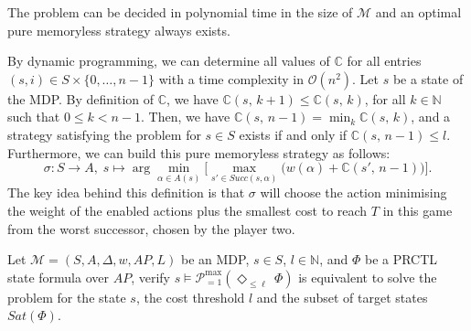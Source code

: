 \begin{theorem} The \SPG{} problem can be decided in polynomial time in the size of $\mathcal{M}$ and %
an optimal pure memoryless strategy always exists.%
\end{theorem}

By dynamic programming, we can determine all values of $\mathbb{C}$ for all entries $(s, i) \in S \times \{0, \dots, n-1\}$ with a time complexity in $\mathcal{O}(n^2)$.
Let $s$ be a state of the MDP. By definition of $\mathbb{C}$, we have $\mathbb{C}(s,\, k + 1) \leq \mathbb{C}(s,\, k)$, for all $k \in \mathbb{N}$ such that $0 \leq k < n-1$.
Then, we have $\mathbb{C}(s, \, n-1) = \min_{k} \mathbb{C}(s, \, k)$, and
a strategy satisfying the \SPG{} problem for $s \in S$ exists if and only if $\mathbb{C}(s,\, n-1) \leq l$.
Furthermore, we can build this pure memoryless strategy as follows:
\[
  \sigma : S \rightarrow A, \; s \mapsto \arg \min_{\alpha \in A(s)} \big[ \max_{s' \in Succ(s, \alpha)} \big(w(\alpha) + \mathbb{C}(s',\, n - 1) \big) \big].
\]
The key idea behind this definition is that $\sigma$ will choose the action minimising the weight of the enabled actions plus the smallest cost to reach $T$ in this game from the worst successor, chosen by the player two.

\begin{remark}
  Let $\mathcal{M}=(S, A, \Delta, w, AP, L)$ be an MDP, $s \in S$, $l \in \mathbb{N}$, and $\Phi$ be a PRCTL state formula over $AP$,
  verify $s \models \mathcal{P}^{\max}_{=1}(\Diamond_{\leq \ell}\, \Phi)$ is equivalent to solve the \SPG{} problem for the state $s$, the cost threshold $l$ and the subset of target states $Sat(\Phi)$.
\end{remark}


